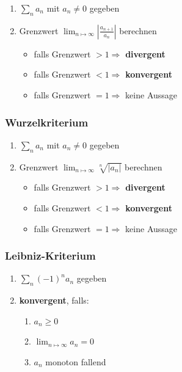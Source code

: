 \begin{enumerate}
	\item $\sum_n a_n$ mit $a_n \neq 0$ gegeben
	\item Grenzwert $\lim_{n\mapsto\infty}|\frac{a_{n+1}}{a_n}|$ berechnen
	\begin{itemize}
		\item falls Grenzwert $> 1 \Rightarrow$ \textbf{divergent}
		\item falls Grenzwert $< 1 \Rightarrow$ \textbf{konvergent}
		\item falls Grenzwert $= 1 \Rightarrow$ keine Aussage
	\end{itemize}
\end{enumerate}

\subsubsection*{Wurzelkriterium}

\begin{enumerate}
	\item $\sum_n a_n$ mit $a_n \neq 0$ gegeben
	\item Grenzwert $\lim_{n\mapsto\infty}\sqrt[n]{|a_n|}$ berechnen
	\begin{itemize}
		\item falls Grenzwert $> 1 \Rightarrow$ \textbf{divergent}
		\item falls Grenzwert $< 1 \Rightarrow$ \textbf{konvergent}
		\item falls Grenzwert $= 1 \Rightarrow$ keine Aussage
	\end{itemize}
\end{enumerate}

\subsubsection*{Leibniz-Kriterium}

\begin{enumerate}
	\item $\sum_n (-1)^n a_n$ gegeben
	\item \textbf{konvergent}, falls:
	\begin{enumerate}
		\item $a_n \geq 0$
		\item $\lim_{n\mapsto\infty} a_n = 0$
		\item $a_n$ monoton fallend
	\end{enumerate}
\end{enumerate}

